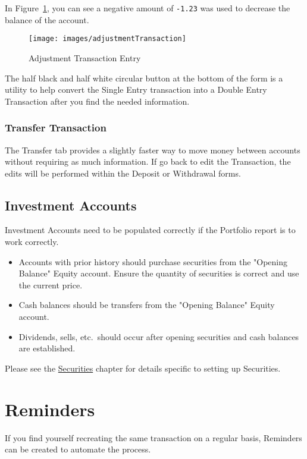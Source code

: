 \documentclass[letterpaper,12pt]{book}
\begin{document}
    In Figure~\ref{fig:adjustment-trans}, you can see a negative amount of \texttt{-1.23} was used to decrease the balance of the account.

    \begin{figure}[H]
        \caption{Adjustment Transaction Entry} \label{fig:adjustment-trans}
        \texttt{[image: images/adjustmentTransaction]}
    \end{figure}


    The half black and half white circular button at the bottom of the form is a utility to help convert the
    Single Entry transaction into a Double Entry Transaction after you find the needed information.

    \subsection{Transfer Transaction}
    The Transfer tab provides a slightly faster way to move money between accounts without requiring as much information.
    If go back to edit the Transaction, the edits will be performed within the Deposit or Withdrawal forms.
    
    \section{Investment Accounts}
    Investment Accounts need to be populated correctly if the Portfolio report is to work correctly.

    \begin{itemize}
        \item Accounts with prior history should purchase securities from the "Opening Balance" Equity account. Ensure the quantity of
        securities is correct and use the current price.
        \item Cash balances should be transfers from the "Opening Balance" Equity account.
        \item Dividends, sells, etc.\ should occur after opening securities and cash balances are established.
    \end{itemize}

    Please see the \hyperref[ch:securities]{Securities} chapter for details specific to setting up Securities.

    \chapter{Reminders}
    If you find yourself recreating the same transaction on a regular basis, Reminders can be created to automate the process.
\end{document}
